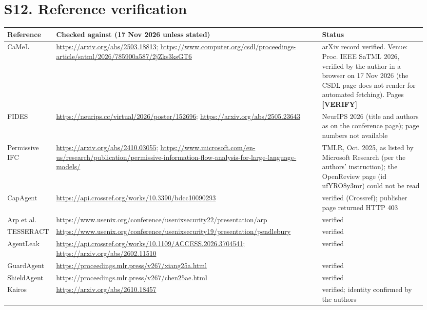 \documentclass[10pt]{article}
\begin{document}
\section*{S12. Reference verification}

{\footnotesize
\setlength{\tabcolsep}{3pt}
\begin{longtable}{>{\raggedright\arraybackslash}p{0.281\dimexpr\linewidth-6\tabcolsep\relax}>{\raggedright\arraybackslash}p{0.359\dimexpr\linewidth-6\tabcolsep\relax}>{\raggedright\arraybackslash}p{0.359\dimexpr\linewidth-6\tabcolsep\relax}}
\hline
\textbf{Reference} & \textbf{Checked against (17 Nov 2026 unless stated)} & \textbf{Status} \\
\hline
\endhead
CaMeL & \url{https://arxiv.org/abs/2503.18813}; \url{https://www.computer.org/csdl/proceedings-article/satml/2026/785900a587/2jZks3ksGT6} & arXiv record verified. Venue: Proc. IEEE SaTML 2026, verified by the author in a browser on 17 Nov 2026 (the CSDL page does not render for automated fetching). Pages \textbf{[VERIFY]} \\
FIDES & \url{https://neurips.cc/virtual/2026/poster/152696}; \url{https://arxiv.org/abs/2505.23643} & NeurIPS 2026 (title and authors as on the conference page); page numbers not available \\
Permissive IFC & \url{https://arxiv.org/abs/2410.03055}; \url{https://www.microsoft.com/en-us/research/publication/permissive-information-flow-analysis-for-large-language-models/} & TMLR, Oct. 2025, as listed by Microsoft Research (per the authors' instruction); the OpenReview page (id ufYRO8y3mr) could not be read \\
CapAgent & \url{https://api.crossref.org/works/10.3390/bdcc10090293} & verified (Crossref); publisher page returned HTTP 403 \\
Arp et al. & \url{https://www.usenix.org/conference/usenixsecurity22/presentation/arp} & verified \\
TESSERACT & \url{https://www.usenix.org/conference/usenixsecurity19/presentation/pendlebury} & verified \\
AgentLeak & \url{https://api.crossref.org/works/10.1109/ACCESS.2026.3704541}; \url{https://arxiv.org/abs/2602.11510} & verified \\
GuardAgent & \url{https://proceedings.mlr.press/v267/xiang25a.html} & verified \\
ShieldAgent & \url{https://proceedings.mlr.press/v267/chen25ae.html} & verified \\
Kairos & \url{https://arxiv.org/abs/2610.18457} & verified; identity confirmed by the authors \\

\end{longtable}}
\end{document}
